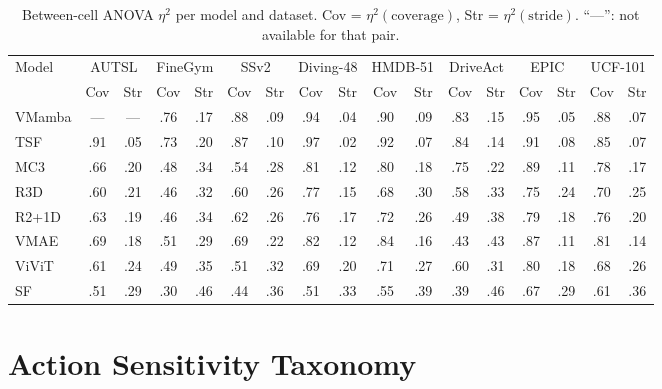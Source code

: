 \documentclass[a4paper, 10pt, conference, onecolumn]{ieeeconf}
\newcommand{\tabtight}{\setlength{\tabcolsep}{3.5pt}\renewcommand{\arraystretch}{1.12}}
\begin{document}
\begin{table}[!htbp]
\centering
\caption{Between-cell ANOVA $\eta^2$ per model and dataset. Cov = $\eta^2(\text{coverage})$, Str = $\eta^2(\text{stride})$. ``---'': not available for that pair.}
\label{tab:anova_full}
\scriptsize\tabtight
\begin{adjustbox}{max width=\textwidth}
\begin{tabular}{l *{8}{cc}}
\toprule
\multirow{2}{*}{Model} & \multicolumn{2}{c}{AUTSL} & \multicolumn{2}{c}{FineGym} & \multicolumn{2}{c}{SSv2} & \multicolumn{2}{c}{Diving-48} & \multicolumn{2}{c}{HMDB-51} & \multicolumn{2}{c}{DriveAct} & \multicolumn{2}{c}{EPIC}
 & \multicolumn{2}{c}{UCF-101} \\
\cmidrule(lr){2-3}\cmidrule(lr){4-5}\cmidrule(lr){6-7}\cmidrule(lr){8-9} \cmidrule(lr){10-11}\cmidrule(lr){12-13}\cmidrule(lr){14-15}\cmidrule(lr){16-17} & Cov & Str & Cov & Str & Cov & Str & Cov & Str & Cov & Str & Cov & Str & Cov & Str
 & Cov & Str \\
\midrule
VMamba & --- & --- & .76 & .17 & .88 & .09 & .94 & .04 & .90 & .09 & .83 & .15 & .95 & .05 & .88 & .07 \\
TSF    & .91 & .05 & .73 & .20 & .87 & .10 & .97 & .02 & .92 & .07 & .84 & .14 & .91 & .08 & .85 & .07 \\
MC3    & .66 & .20 & .48 & .34 & .54 & .28 & .81 & .12 & .80 & .18 & .75 & .22 & .89 & .11 & .78 & .17 \\
R3D    & .60 & .21 & .46 & .32 & .60 & .26 & .77 & .15 & .68 & .30 & .58 & .33 & .75 & .24 & .70 & .25 \\
R2+1D  & .63 & .19 & .46 & .34 & .62 & .26 & .76 & .17 & .72 & .26 & .49 & .38 & .79 & .18 & .76 & .20 \\
VMAE   & .69 & .18 & .51 & .29 & .69 & .22 & .82 & .12 & .84 & .16 & .43 & .43 & .87 & .11 & .81 & .14 \\
ViViT  & .61 & .24 & .49 & .35 & .51 & .32 & .69 & .20 & .71 & .27 & .60 & .31 & .80 & .18 & .68 & .26 \\
SF     & .51 & .29 & .30 & .46 & .44 & .36 & .51 & .33 & .55 & .39 & .39 & .46 & .67 & .29 & .61 & .36 \\
\bottomrule
\end{tabular}
\end{adjustbox}
\end{table}

\section{Action Sensitivity Taxonomy}
\label{sec:sup_taxonomy}
\end{document}
